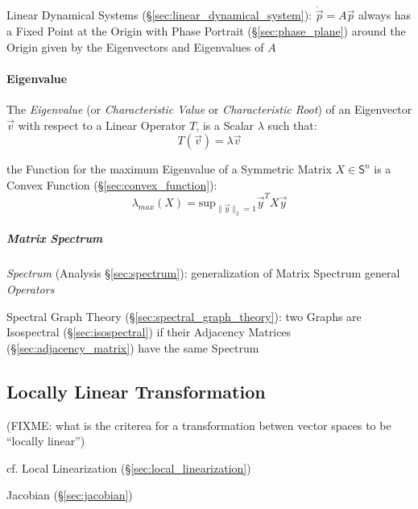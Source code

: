\fist Linear Dynamical Systems (\S\ref{sec:linear_dynamical_system}):
$\dot{\vec{p}} = A\vec{p}$ always has a Fixed Point at the Origin with Phase
Portrait (\S\ref{sec:phase_plane}) around the Origin given by the Eigenvectors
and Eigenvalues of $A$



\paragraph{Eigenvalue}\label{sec:eigenvalue}\hfill

The \emph{Eigenvalue} (or \emph{Characteristic Value} or \emph{Characteristic
  Root}) of an Eigenvector $\vec{v}$ with respect to a Linear Operator $T$, is a
Scalar $\lambda$ such that:
\[
  T(\vec{v}) = \lambda\vec{v}
\]

the Function for the maximum Eigenvalue of a Symmetric Matrix $X \in
\mathsf{S}^n$ is a Convex Function (\S\ref{sec:convex_function}):
\[
  \lambda_{max}(X) = \mathrm{sup}_{\|\vec{y}\|_2=1} \vec{y}^T X \vec{y}
\]



\subparagraph{Matrix Spectrum}\label{sec:matrix_spectrum}\hfill

\fist \emph{Spectrum} (Analysis \S\ref{sec:spectrum}): generalization of Matrix
Spectrum general \emph{Operators}

\fist Spectral Graph Theory (\S\ref{sec:spectral_graph_theory}): two Graphs are
Isospectral (\S\ref{sec:isospectral}) if their Adjacency Matrices
(\S\ref{sec:adjacency_matrix}) have the same Spectrum



\subsection{Locally Linear Transformation}\label{sec:locally_linear}


(FIXME: what is the criterea for a transformation betwen vector spaces to be
``locally linear'')

\fist cf. Local Linearization (\S\ref{sec:local_linearization})

\fist Jacobian (\S\ref{sec:jacobian})



